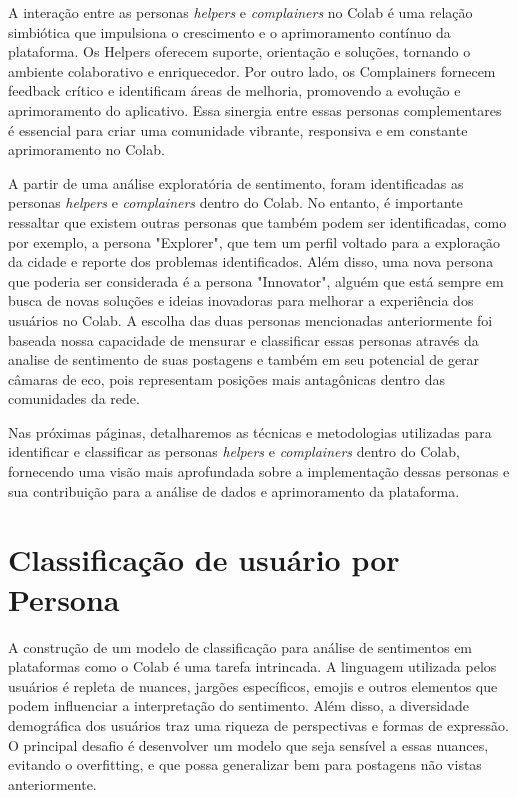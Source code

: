 A interação entre as personas \textit{helpers} e \textit{complainers} no Colab é uma relação simbiótica que impulsiona o crescimento e o aprimoramento contínuo da plataforma. Os Helpers oferecem suporte, orientação e soluções, tornando o ambiente colaborativo e enriquecedor. Por outro lado, os Complainers fornecem feedback crítico e identificam áreas de melhoria, promovendo a evolução e aprimoramento do aplicativo. Essa sinergia entre essas personas complementares é essencial para criar uma comunidade vibrante, responsiva e em constante aprimoramento no Colab.

A partir de uma análise exploratória de sentimento, foram identificadas as personas \textit{helpers} e \textit{complainers} dentro do Colab. No entanto, é importante ressaltar que existem outras personas que também podem ser identificadas, como por exemplo, a persona "Explorer", que tem um perfil voltado para a exploração da cidade e reporte dos problemas identificados. Além disso, uma nova persona que poderia ser considerada é a persona "Innovator", alguém que está sempre em busca de novas soluções e ideias inovadoras para melhorar a experiência dos usuários no Colab. A escolha das duas personas mencionadas anteriormente foi baseada nossa capacidade de mensurar e classificar essas personas através da analise de sentimento de suas postagens e também em seu potencial de gerar câmaras de eco, pois representam posições mais antagônicas dentro das comunidades da rede.

Nas próximas páginas, detalharemos as técnicas e metodologias utilizadas para identificar e classificar as personas \textit{helpers} e \textit{complainers} dentro do Colab, fornecendo uma visão mais aprofundada sobre a implementação dessas personas e sua contribuição para a análise de dados e aprimoramento da plataforma.

\section{Classificação de usuário por Persona}

A construção de um modelo de classificação para análise de sentimentos em plataformas como o Colab é uma tarefa intrincada. A linguagem utilizada pelos usuários é repleta de nuances, jargões específicos, emojis e outros elementos que podem influenciar a interpretação do sentimento. Além disso, a diversidade demográfica dos usuários traz uma riqueza de perspectivas e formas de expressão. O principal desafio é desenvolver um modelo que seja sensível a essas nuances, evitando o overfitting, e que possa generalizar bem para postagens não vistas anteriormente.

